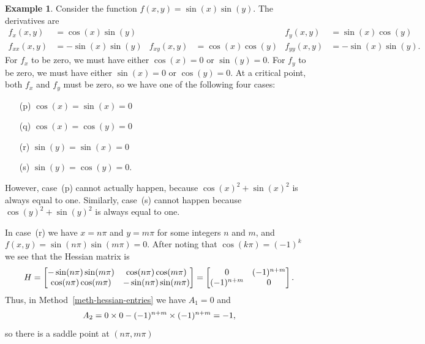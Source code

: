\documentclass[reqno]{amsart}
\theoremstyle{definition}
\newtheorem{example}[theorem]{Example}
\begin{document}
\begin{example}\label{eg-sin-crit}
 Consider the function $f(x,y)=\sin(x)\sin(y)$.  The derivatives are 
 \begin{align*}
  f_x(x,y)    &= \cos(x)\sin(y) & & & f_y(x,y) &= \sin(x)\cos(y) \\
  f_{xx}(x,y) &= -\sin(x)\sin(y) & f_{xy}(x,y) &= \cos(x)\cos(y) & f_{yy}(x,y) &= -\sin(x)\sin(y). 
 \end{align*}
 For $f_x$ to be zero, we must have either $\cos(x)=0$ or
 $\sin(y)=0$.  For $f_y$ to be zero, we must have either $\sin(x)=0$
 or $\cos(y)=0$.  At a critical point, both $f_x$ and $f_y$ must be
 zero, so we have one of the following four cases:
 \begin{itemize}
  \item[(p)] $\cos(x)=\sin(x)=0$
  \item[(q)] $\cos(x)=\cos(y)=0$
  \item[(r)] $\sin(y)=\sin(x)=0$
  \item[(s)] $\sin(y)=\cos(y)=0$.
 \end{itemize}
 However, case~(p) cannot actually happen, because
 $\cos(x)^2+\sin(x)^2$ is always equal to one.  Similarly, case~(s)
 cannot happen because $\cos(y)^2+\sin(y)^2$ is always equal to one.

 In case~(r) we have $x=n\pi$ and $y=m\pi$ for some integers $n$ and
 $m$, and $f(x,y)=\sin(n\pi)\sin(m\pi)=0$.  After noting that
 $\cos(k\pi)=(-1)^k$ we see that the Hessian matrix is
 \[ H =
     \left[\begin{matrix} -\sin(n\pi)\sin(m\pi) & \cos(n\pi)\cos(m\pi) \\
          \cos(n\pi)\cos(m\pi) & -\sin(n\pi)\sin(m\pi) \end{matrix}\right] = 
     \left[\begin{matrix} 0 & (-1)^{n+m} \\ (-1)^{n+m} & 0 \end{matrix}\right].
 \]
 Thus, in Method~\ref{meth-hessian-entries} we have $A_1=0$ and
 \[ A_2 = 0\times 0 - (-1)^{n+m}\times (-1)^{n+m} = -1, \]
 so there is a saddle point at $(n\pi,m\pi)$


\end{example}
\end{document}

